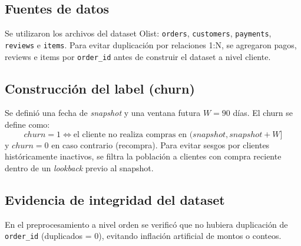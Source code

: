 \subsection*{Fuentes de datos}
Se utilizaron los archivos del dataset Olist: \texttt{orders}, \texttt{customers}, \texttt{payments}, \texttt{reviews} e \texttt{items}. Para evitar duplicación por relaciones 1:N, se agregaron pagos, reviews e items por \texttt{order\_id} antes de construir el dataset a nivel cliente.

\subsection*{Construcción del label (churn)}
Se definió una fecha de \textit{snapshot} y una ventana futura $W=90$ días. El churn se define como:
\[
churn=1 \Leftrightarrow \text{el cliente no realiza compras en } (snapshot, snapshot+W]
\]
y $churn=0$ en caso contrario (recompra). Para evitar sesgos por clientes históricamente inactivos, se filtra la población a clientes con compra reciente dentro de un \textit{lookback} previo al snapshot.

\subsection*{Evidencia de integridad del dataset}
En el preprocesamiento a nivel orden se verificó que no hubiera duplicación de \texttt{order\_id} (duplicados = 0), evitando inflación artificial de montos o conteos.